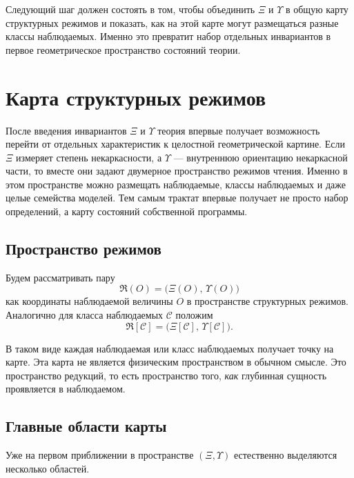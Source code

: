 \documentclass[12pt,a4paper]{article}
\begin{document}
Следующий шаг должен состоять в том, чтобы объединить \(\Xi\) и \(\Upsilon\) в общую карту структурных режимов и показать, как на этой карте могут размещаться разные классы наблюдаемых. Именно это превратит набор отдельных инвариантов в первое геометрическое пространство состояний теории.


\section{Карта структурных режимов}

После введения инвариантов \(\Xi\) и \(\Upsilon\) теория впервые получает возможность перейти от отдельных характеристик к целостной геометрической картине. Если \(\Xi\) измеряет степень некаркасности, а \(\Upsilon\) --- внутреннюю ориентацию некаркасной части, то вместе они задают двумерное пространство режимов чтения. Именно в этом пространстве можно размещать наблюдаемые, классы наблюдаемых и даже целые семейства моделей. Тем самым трактат впервые получает не просто набор определений, а карту состояний собственной программы.

\subsection{Пространство режимов}

Будем рассматривать пару
\begin{equation}
\mathfrak{R}(O) = \big( \Xi(O), \, \Upsilon(O) \big)
\end{equation}
как координаты наблюдаемой величины \(O\) в пространстве структурных режимов. Аналогично для класса наблюдаемых \(\mathcal{C}\) положим
\begin{equation}
\mathfrak{R}[\mathcal{C}] = \big( \Xi[\mathcal{C}], \, \Upsilon[\mathcal{C}] \big).
\end{equation}

В таком виде каждая наблюдаемая или класс наблюдаемых получает точку на карте. Эта карта не является физическим пространством в обычном смысле. Это пространство редукций, то есть пространство того, \textit{как} глубинная сущность проявляется в наблюдаемом.

\subsection{Главные области карты}

Уже на первом приближении в пространстве \((\Xi,\Upsilon)\) естественно выделяются несколько областей.
\end{document}
